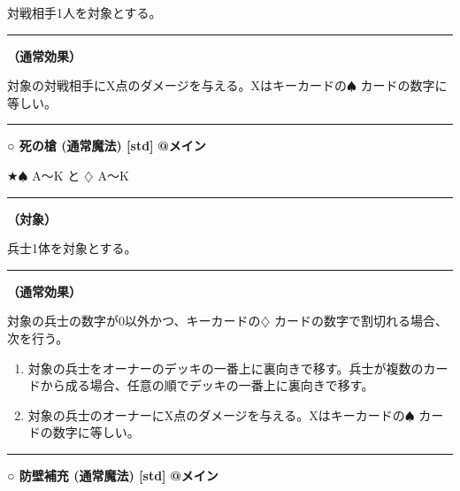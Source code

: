 \documentclass[twocolumn,a5paper,papersize,10pt]{jarticle}
\begin{document}
対戦相手1人を対象とする。
\vspace{1mm}%
\hrule height 0.1mm depth 0mm width 66.5mm %
\vspace{1mm}%

{\bf（通常効果）}

対象の対戦相手にX点のダメージを与える。Xはキーカードの{\normalsize $\spadesuit$} カードの数字に等しい。
\vspace{2mm} %
\hrule height 0.5mm depth 0mm width 66.5mm %
\vspace{1mm} %
{\normalsize\bf ○ 死の槍 {\scriptsize (通常魔法) [std]}} %
\hfill 
{\small\bf @メイン }

★{\normalsize $\spadesuit$} A〜K と {\normalsize $\diamondsuit$} A〜K

\vspace{1mm}%
\hrule height 0.1mm depth 0mm width 66.5mm %
\vspace{1mm}%
{\bf（対象）}

兵士1体を対象とする。
\vspace{1mm}%
\hrule height 0.1mm depth 0mm width 66.5mm %
\vspace{1mm}%

{\bf（通常効果）}

対象の兵士の数字が0以外かつ、キーカードの{\normalsize $\diamondsuit$} カードの数字で割切れる場合、次を行う。


\vspace{-1zh}%
\begin{enumerate}
\setlength{\leftskip}{-0.3cm}
\setlength{\parskip}{0pt} %

\item 対象の兵士をオーナーのデッキの一番上に裏向きで移す。兵士が複数のカードから成る場合、任意の順でデッキの一番上に裏向きで移す。

\item 対象の兵士のオーナーにX点のダメージを与える。Xはキーカードの{\normalsize $\spadesuit$} カードの数字に等しい。
\vspace{-1zh}%
\end{enumerate}
\vspace{2mm} %
\hrule height 0.5mm depth 0mm width 66.5mm %
\vspace{1mm} %
{\normalsize\bf ○ 防壁補充 {\scriptsize (通常魔法) [std]}} %
\hfill 
{\small\bf @メイン }
\end{document}
